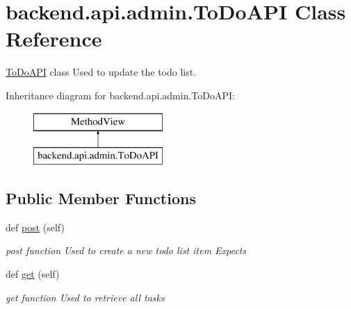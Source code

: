 \hypertarget{classbackend_1_1api_1_1admin_1_1_to_do_a_p_i}{}\section{backend.\+api.\+admin.\+To\+Do\+A\+P\+I Class Reference}
\label{classbackend_1_1api_1_1admin_1_1_to_do_a_p_i}


\hyperlink{classbackend_1_1api_1_1admin_1_1_to_do_a_p_i}{To\+Do\+A\+P\+I} class Used to update the todo list.  


Inheritance diagram for backend.\+api.\+admin.\+To\+Do\+A\+P\+I\+:\begin{figure}[H]
\begin{center}
\leavevmode
\includegraphics[height=2.000000cm]{classbackend_1_1api_1_1admin_1_1_to_do_a_p_i}
\end{center}
\end{figure}
\subsection*{Public Member Functions}
\begin{DoxyCompactItemize}
\item 
def \hyperlink{classbackend_1_1api_1_1admin_1_1_to_do_a_p_i_a919fd8eecc3c3623458a7b45936886f4}{post} (self)
\begin{DoxyCompactList}\small\item\em post function Used to create a new todo list item Expects \end{DoxyCompactList}\item 
\hypertarget{classbackend_1_1api_1_1admin_1_1_to_do_a_p_i_aeb8027bd698872b44762f406c1e7832f}{}def \hyperlink{classbackend_1_1api_1_1admin_1_1_to_do_a_p_i_aeb8027bd698872b44762f406c1e7832f}{get} (self)\label{classbackend_1_1api_1_1admin_1_1_to_do_a_p_i_aeb8027bd698872b44762f406c1e7832f}

\begin{DoxyCompactList}\small\item\em get function Used to retrieve all tasks \end{DoxyCompactList}\end{DoxyCompactItemize}



